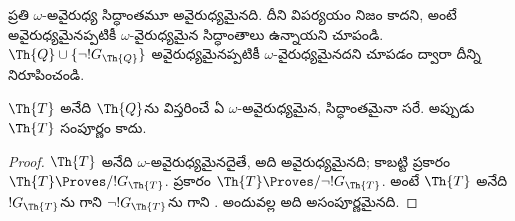 \documentclass[../../../include/open-logic-section]{subfiles}
\begin{document}
\begin{prob}
ప్రతి $\omega$-అవైరుధ్య సిద్ధాంతమూ అవైరుధ్యమైనది. దీని విపర్యయం నిజం కాదని,
అంటే అవైరుధ్యమైనప్పటికీ $\omega$-వైరుధ్యమైన సిద్ధాంతాలు ఉన్నాయని చూపండి.
$\Th{Q} \cup \{\lnot !G_\Th{Q}\}$ అవైరుధ్యమైనప్పటికీ
$\omega$-వైరుధ్యమైనదని చూపడం ద్వారా దీన్ని నిరూపించండి.
\end{prob}

\begin{thm}
 $\Th{T}$ అనేది $\Th{Q}$ను విస్తరించే ఏ
$\omega$-అవైరుధ్యమైన,  సిద్ధాంతమైనా సరే.
అప్పుడు $\Th{T}$ సంపూర్ణం కాదు.
\end{thm}

\begin{proof}
$\Th{T}$ అనేది $\omega$-అవైరుధ్యమైనదైతే, అది అవైరుధ్యమైనది; కాబట్టి
 ప్రకారం $\Th{T} \Proves/ !G_\Th{T}$.
 ప్రకారం $\Th{T} \Proves/ \lnot !G_\Th{T}$.
అంటే $\Th{T}$ అనేది $!G_\Th{T}$ను గాని $\lnot !G_\Th{T}$ను గాని
. అందువల్ల అది అసంపూర్ణమైనది.
\end{proof}
\end{document}
